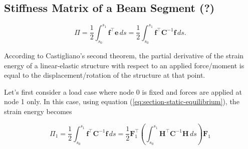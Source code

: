 %
%
%
%

\newpage
\subsection{Stiffness Matrix of a Beam Segment (?)}

\begin{equation}
\Pi = \frac{1}{2}\int_{s_0}^{s_1} \boldsymbol{f}^\intercal\boldsymbol{e}\,ds = \frac{1}{2}\int_{s_0}^{s_1} \boldsymbol{f}^\intercal\boldsymbol{C}^{-1}\boldsymbol{f}\,ds.
\end{equation}

According to Castigliano's second theorem, the partial derivative of the strain energy of a linear-elastic structure with respect to an applied force/moment is equal to the displacement/rotation of the structure at that point.

Let's first consider a load case where node 0 is fixed and forces are applied at node 1 only.
In this case, using equation (\ref{eq:section-static-equilibrium}), the strain energy becomes

\begin{equation}
\Pi_1 = \frac{1}{2}\int_{s_0}^{s_1} \boldsymbol{f}^\intercal\boldsymbol{C}^{-1}\boldsymbol{f}\,ds = \frac{1}{2}\boldsymbol{F}_1^\intercal\left(\int_{s_0}^{s_1} \boldsymbol{H}^\intercal\boldsymbol{C}^{-1}\boldsymbol{H}\,ds\right)\boldsymbol{F}_1
\end{equation}

